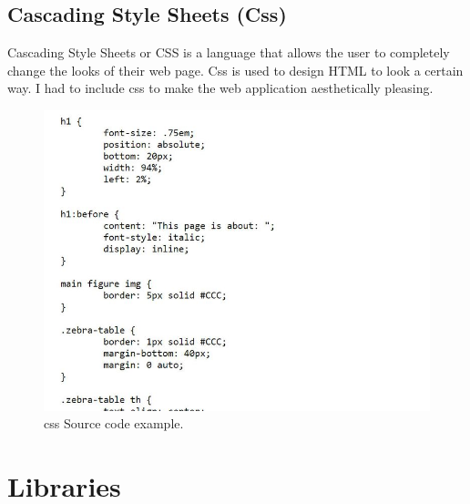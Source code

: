 \subsection{Cascading Style Sheets (Css)}
Cascading Style Sheets or CSS is a language that allows the user to completely change the looks of their web page. Css is used to design HTML to look a certain way. I had to include css to make the web application aesthetically pleasing. 
\begin{figure}[!htbp] 
    \centering
    \includegraphics[scale = 0.7]{img/css.jpg}
    \caption{css Source code example.}
    \label{fig:my_label}
\end{figure}

\section{Libraries}
